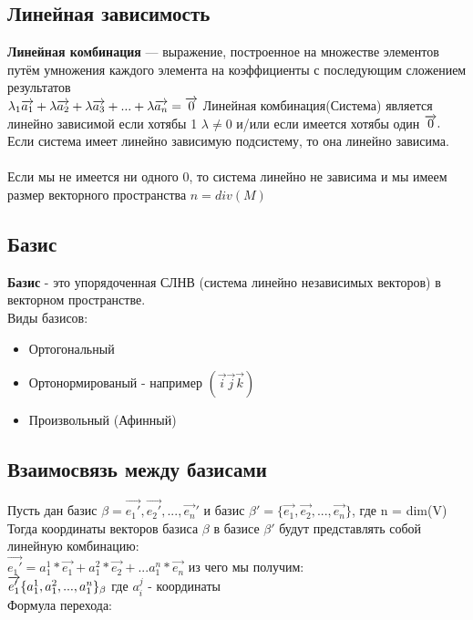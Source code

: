 \documentclass{book}
\begin{document}
\subsection{Линейная зависимость}
\textbf{Линейная комбинация} — выражение, построенное на множестве элементов путём умножения каждого элемента на коэффициенты с последующим сложением результатов\\
$\lambda_1\overrightarrow{a_1}+\lambda\overrightarrow{a_2}+\lambda\overrightarrow{a_3}+...+\lambda\overrightarrow{a_n}=\overrightarrow{0}\\$
Линейная комбинация(Система) является линейно зависимой если хотябы 1 $\lambda\neq0$ и/или если имеется хотябы один $\overrightarrow{0}.\\$
Если система имеет линейно зависимую подсистему, то она линейно зависима.\\\\
Если мы не имеется ни одного 0, то система линейно не зависима и мы имеем размер векторного пространства $n = div(M)$
\subsection{Базис}
\textbf{Базис} - это упорядоченная СЛНВ (система линейно независимых векторов) в векторном пространстве.\\
Виды базисов:
\begin{itemize}
    \item Ортогональный
    \item Ортонормированый - например $(\overrightarrow{i}\overrightarrow{j}\overrightarrow{k})$
    \item Произвольный (Афинный)
\end{itemize}
\subsection{Взаимосвязь между базисами}
Пусть дан базис $\beta={\overrightarrow{e_1'},\overrightarrow{e_2'},...,\overrightarrow{e_n}'}$ и базис $\beta'=\{\overrightarrow{e_1},\overrightarrow{e_2},...,\overrightarrow{e_n}\}$, где n = dim(V)\\
Тогда координаты векторов базиса $\beta$ в базисе $\beta'$ будут представлять собой линейную комбинацию: \\
$\overrightarrow{e_1'}=a_1^1*\overrightarrow{e_1}+a_1^2*\overrightarrow{e_2}+...a_1^n*\overrightarrow{e_n}$ из чего мы получим:\\
$\overrightarrow{e_1'}\{a_1^1,a_1^2,...,a_1^n\}_\beta\\$
где $a^j_i$ - координаты\\
Формула перехода:
\end{document}
